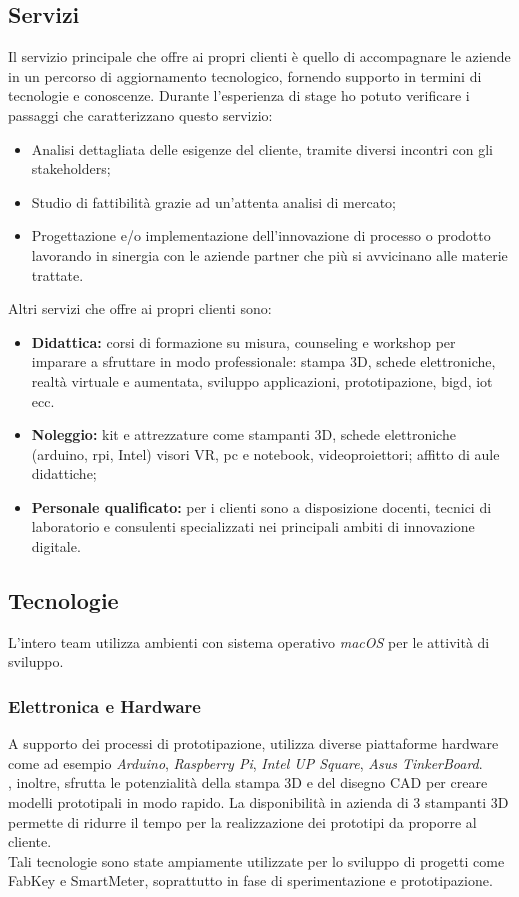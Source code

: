 \subsection{Servizi}
Il servizio principale che \lab{} offre ai propri clienti è quello di accompagnare le aziende in un percorso di aggiornamento tecnologico, fornendo supporto in termini di tecnologie e conoscenze.
Durante l'esperienza di stage ho potuto verificare i passaggi che caratterizzano questo servizio:
\begin{itemize}
\item Analisi dettagliata delle esigenze del cliente, tramite diversi incontri con gli stakeholders;
\item Studio di fattibilità grazie ad un'attenta analisi di mercato;
\item Progettazione e/o implementazione dell'innovazione di processo o prodotto lavorando in sinergia con le aziende partner che più si avvicinano alle materie trattate.
\end{itemize}
Altri servizi che \lab{} offre ai propri clienti sono:
\begin{itemize}
\item \textbf{Didattica:} corsi di formazione su misura, \gls{counseling} e \gls{workshop} per imparare a sfruttare in modo professionale: stampa 3D, schede elettroniche, realtà virtuale e aumentata, sviluppo applicazioni, prototipazione, \gls{bigd}, \gls{iot} ecc.
\item \textbf{Noleggio:} kit e attrezzature come stampanti 3D, schede elettroniche (\gls{arduino}, \gls{rpi}, Intel) visori VR, pc e notebook, videoproiettori; affitto di aule didattiche;
\item \textbf{Personale qualificato:} per i clienti sono a disposizione docenti, tecnici di laboratorio e consulenti specializzati nei principali ambiti di innovazione digitale.
\end{itemize}

\subsection{Tecnologie}
L'intero team utilizza ambienti con sistema operativo \textit{macOS} per le attività di sviluppo. 
\subsubsection{Elettronica e Hardware}
A supporto dei processi di prototipazione, \lab{} utilizza diverse piattaforme hardware come ad esempio \textit{Arduino}, \textit{Raspberry Pi}, \textit{Intel UP Square}, \textit{Asus TinkerBoard}.\\
\lab{}, inoltre, sfrutta le potenzialità della stampa 3D e del disegno CAD per creare modelli prototipali in modo rapido. La disponibilità in azienda di 3 stampanti 3D permette di ridurre il tempo per la realizzazione dei prototipi da proporre al cliente.\\
Tali tecnologie sono state ampiamente utilizzate per lo sviluppo di progetti come FabKey e SmartMeter, soprattutto in fase di sperimentazione e prototipazione.

